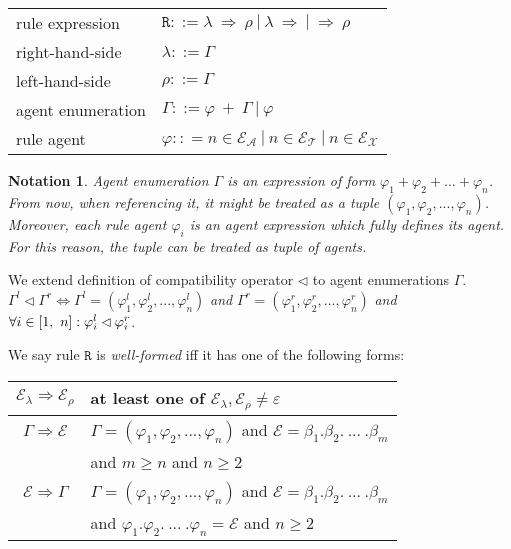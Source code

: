 \documentclass{entcs}
\renewcommand{\~}[0]{\texttildelow}
\newcommand{\choice}{|}
\newtheorem{notation}[thm]{Notation}
\begin{document}
\begin{center}
{\small
\hspace*{-1cm}\begin{tabular}{ l l }
 rule expression & $\mathtt{R} ::= \lambda ~\Rightarrow~ \rho ~|~ \lambda ~\Rightarrow ~|~ \Rightarrow~ \rho $\\
 right-hand-side & $\lambda ::= \Gamma$\\
 left-hand-side & $\rho ::= \Gamma$\\
 agent enumeration & $\Gamma ::= \varphi~ +~\Gamma ~|~ \varphi$\\
 rule agent & $\varphi :: = n \in \mathcal{E}_\mathcal{A}~\choice~n \in \mathcal{E}_\mathcal{T}~\choice~n \in \mathcal{E}_\mathcal{X}$\\
\end{tabular}
}
\end{center}

\begin{notation} \label{mynote}
Agent enumeration $\Gamma$ is an expression of form $\varphi_1 + \varphi_2 + ... + \varphi_n$. From now, when referencing it, it might be treated as a tuple $(\varphi_1, \varphi_2, ..., \varphi_n)$. Moreover, each rule agent $\varphi_i$ is an agent expression which fully defines its agent. For this reason, the tuple can be treated as tuple of agents. 
\end{notation} 

\begin{defn}
We extend definition of compatibility operator $\lhd$ to agent enumerations $\Gamma$. $\Gamma^{l} \lhd \Gamma^{r} \Leftrightarrow \Gamma^{l} = (\varphi^{l}_1, \varphi^{l}_2, ..., \varphi^{l}_n)$ \emph{and} $\Gamma^{r} = (\varphi^{r}_1, \varphi^{r}_2, ..., \varphi^{r}_n)$ \emph{and} $\\ \forall i \in [1,~n] : \varphi^{l}_i \lhd \varphi^{r}_i $.
\end{defn}

\begin{defn} \label{well}
We say rule $\mathtt{R}$ is \emph{well-formed} iff it has one of the following forms:
\begin{center}
\begin{tabular}{c@{\hskip 1in}l}
	$\mathcal{E}_\lambda \Rightarrow \mathcal{E}_\rho$ & at least one of $\mathcal{E}_\lambda, \mathcal{E}_\rho \neq \varepsilon $\\
	\hline
	$\Gamma \Rightarrow \mathcal{E}$ & $\Gamma = (\varphi_1, \varphi_2, ..., \varphi_n) $ and $\mathcal{E} = \beta_1.\beta_2.~...~.\beta_m$ \\
	 & and $ m \geq n $ and $n \geq 2$ \\
	 \hline
	$\mathcal{E} \Rightarrow \Gamma$ & $\Gamma = (\varphi_1, \varphi_2, ..., \varphi_n) $ and $\mathcal{E} = \beta_1.\beta_2.~...~.\beta_m$ \\
	 & and $ \varphi_1.\varphi_2.~...~.\varphi_n = \mathcal{E} $ and $n \geq 2$\\
\end{tabular}
\end{center}
\end{defn}
\end{document}
